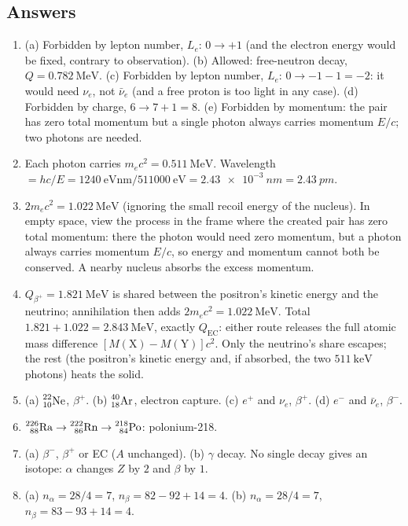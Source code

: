 \subsection*{Answers}
{\small
\begin{enumerate}[itemsep=2pt]
\item (a) Forbidden by lepton number, $L_e$: $0\to+1$ (and the electron energy would be fixed, contrary to
      observation). (b) Allowed: free-neutron decay, $Q=\SI{0.782}{\MeV}$. (c) Forbidden by lepton number, $L_e$:
      $0\to-1-1=-2$: it would need $\nu_e$, not $\bar\nu_e$ (and a free proton is too light in any case).
      (d) Forbidden by charge, $6\to7+1=8$. (e) Forbidden by momentum: the pair has zero total momentum but
      a single photon always carries momentum $E/c$; two photons are needed.
\item Each photon carries $m_ec^2=\SI{0.511}{\MeV}$. Wavelength
      $=hc/E=\SI{1240}{\eV\nano\metre}/\SI{511000}{\eV}=\SI{2.43e-3}{nm}=\SI{2.43}{pm}$.
\item $2m_ec^2=\SI{1.022}{\MeV}$ (ignoring the small recoil energy of the nucleus). In empty space, view the
      process in the frame where the created pair has zero total momentum: there the photon would need zero
      momentum, but a photon always carries momentum $E/c$, so energy and momentum cannot both be
      conserved. A nearby nucleus absorbs the excess momentum.
\item $Q_{\beta^+}=\SI{1.821}{\MeV}$ is shared between the positron's kinetic energy and the neutrino;
      annihilation then adds $2m_ec^2=\SI{1.022}{\MeV}$. Total $1.821+1.022=\SI{2.843}{\MeV}$, exactly
      $Q_{\mathrm{EC}}$: either route releases the full atomic mass difference
      $[M(\mathrm{X})-M(\mathrm{Y})]c^2$. Only the neutrino's share escapes; the rest (the positron's kinetic
      energy and, if absorbed, the two $\SI{511}{\keV}$ photons) heats the solid.
\item (a) $\prescript{22}{10}{\mathrm{Ne}}$, $\beta^+$. (b) $\prescript{40}{18}{\mathrm{Ar}}$, electron capture. (c) $e^+$ and $\nu_e$, $\beta^+$.
      (d) $e^-$ and $\bar\nu_e$, $\beta^-$.
\item $\prescript{226}{88}{\mathrm{Ra}}\to\prescript{222}{86}{\mathrm{Rn}}\to\prescript{218}{84}{\mathrm{Po}}$: polonium-218.
\item (a) $\beta^-$, $\beta^+$ or EC ($A$ unchanged). (b) $\gamma$ decay. No single decay gives an isotope:
      $\alpha$ changes $Z$ by $2$ and $\beta$ by $1$.
\item (a) $n_\alpha=28/4=7$, $n_\beta=82-92+14=4$. (b) $n_\alpha=28/4=7$, $n_\beta=83-93+14=4$.

\end{enumerate}}

